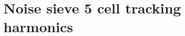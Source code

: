 \chapter{Noise sieve 5 cell tracking harmonics}
\label{chap:noise-sieve-5-cell-tracking-harmonics}

